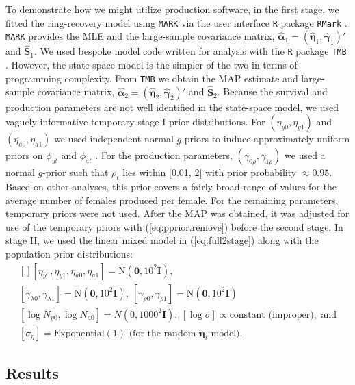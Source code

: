 \documentclass[12pt]{article}
\newcommand{\bn}{\boldsymbol{\eta}}
\newcommand{\bg}{\boldsymbol{\gamma}}
\newcommand{\ba}{\boldsymbol{\alpha}}
\newcommand{\bS}{\mathbf{S}}
\newcommand{\tN}{\text{N}}
\newcommand{\bI}{\mathbf{I}}
\begin{document}
To demonstrate how we might utilize production software, in the first stage, we fitted the ring-recovery model using {\tt MARK} \citep{white1999program} via the user interface {\tt R} package {\tt RMark} \citep{laake2013:RMark}. {\tt MARK} provides the MLE and the large-sample covariance matrix, $\hat{\ba}_1 = (\hat{\bn}_1, \hat{\bg}_1)'$ and $\hat{\bS}_1$.  We used bespoke model code written for analysis with the {\tt R} package {\tt TMB} \citep{kristensen2016tmb}. However, the state-space model is the simpler of the two in terms of programming complexity. From {\tt TMB} we obtain the MAP estimate and large-sample covariance matrix, $\hat{\ba}_2 = (\hat{\bn}_2, \hat{\bg}_2)'$ and $\hat{\bS}_2$. Because the survival and production parameters are not well identified in the state-space model, we used vaguely informative temporary stage I prior distributions. For $(\eta_{y0},\eta_{y1})$ and $(\eta_{a0},\eta_{a1})$ we used independent normal $g$-priors to induce approximately uniform priors on $\phi_{yt}$ and $\phi_{at}$ \citep{hanson2014informative}. For the production parameters, $(\gamma_{0\rho},\gamma_{1\rho})$ we used a normal $g$-prior such that $\rho_t$ lies within [0.01, 2] with prior probability $\approx 0.95$. Based on other analyses, this prior covers a fairly broad range of values for the average number of females produced per female. For the remaining parameters, temporary priors were not used. After the MAP was obtained, it was adjusted for use of the temporary priors with (\ref{eq:pprior.remove}) before the second stage. In stage II, we used the linear mixed model in (\ref{eq:full2stage}) along with the population prior distributions:
\[
\begin{gathered}[]
[\eta_{y0}, \eta_{y1}, \eta_{a0}, \eta_{a1}] = \tN(\mathbf{0}, 10^2\bI),\\
[\gamma_{\lambda 0}, \gamma_{\lambda 1}] = \tN(\mathbf{0}, 10^2\bI),\ [\gamma_{\rho 0}, \gamma_{\rho 1}] = \tN(\mathbf{0}, 10^2\bI) \\
[\log N_{y0}, \log N_{a0}] = N(0, 1000^2\bI),\ [\log \sigma] \propto \text{constant (improper)}, \text{ and}\\
[\sigma_\eta] = \text{Exponential}(1) \text{ (for the random $\bn_i$ model)}.
\end{gathered}
\] 

\subsection{Results} 
\end{document}
